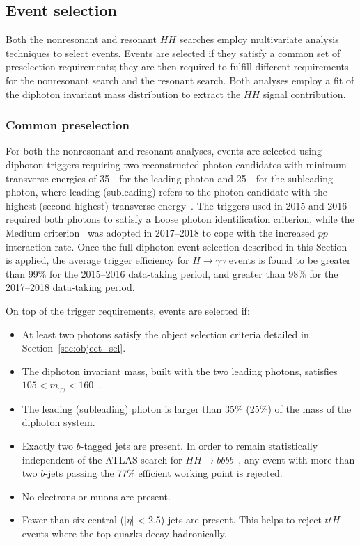 \documentclass[PAPER, cernpreprint, texlive=2016, paper=a4, USenglish, texmf]{atlasdoc}
\begin{document}
 
\subsection{Event selection}
\label{sec:event_selection}
Both the nonresonant and resonant $HH$ searches employ multivariate analysis techniques to select events.
Events are selected if they satisfy a common set of preselection requirements; they are then required to fulfill different requirements for the nonresonant search and the resonant search. Both analyses employ a fit of the diphoton invariant mass distribution to extract the $HH$ signal contribution.
 
\subsubsection{Common preselection}
\label{subsec:preselection}
For both the nonresonant and resonant analyses, events are selected using diphoton triggers requiring two reconstructed photon candidates with minimum transverse energies of 35~\GeV\ for the leading photon and 25~\GeV\ for the subleading photon, where leading (subleading) refers to the photon candidate with the highest (second-highest) transverse energy~\cite{Aad:2019wsl}.
The triggers used in 2015 and 2016 required both photons to satisfy a Loose photon identification criterion, while the Medium criterion~\cite{EGAM-2018-01} was adopted in 2017--2018 to cope with the increased $pp$ interaction rate.
Once the full diphoton event selection described in this Section is applied, the average trigger efficiency for $H\to\gamma\gamma$ events is found to be greater than 99\% for the 2015--2016 data-taking period, and greater than 98\% for the 2017--2018 data-taking period.
 
On top of the trigger requirements, events are selected if:
\begin{itemize}
\item At least two photons satisfy the object selection criteria detailed in Section~\ref{sec:object_sel}.
\item The diphoton invariant mass, built with the two leading photons, satisfies $105 < m_{\gamma\gamma} < 160$~\GeV.
\item The leading (subleading) photon \pT is larger than 35\% (25\%) of the mass of the diphoton system.
\item Exactly two $b$-tagged jets are present. In order to remain statistically independent of the ATLAS search for $HH \rightarrow b\bar{b}b\bar{b}$~\cite{EXOT-2016-31}, any event with more than two $b$-jets passing the 77\% efficient working point is rejected.
\item No electrons or muons are present.
\item Fewer than six central ($|\eta|$ < 2.5) jets are present. This helps to reject $t\bar{t}H$ events where the top quarks decay hadronically.
\end{itemize}
 
\end{document}
